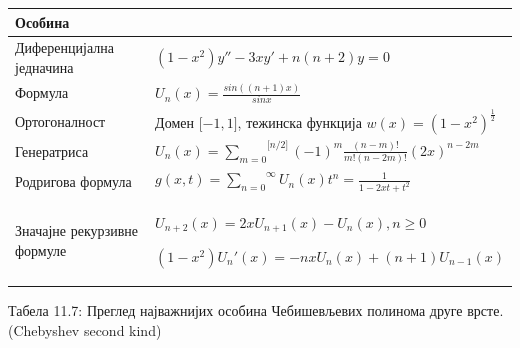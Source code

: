 {\def\LTcaptype{none} %
\begin{longtable}[]{@{}
  >{\raggedright\arraybackslash}p{}
  >{\centering\arraybackslash}p{}@{}}
\toprule\noalign{}
\begin{minipage}[b]{\linewidth}\raggedright
Особина
\end{minipage} & \begin{minipage}[b]{\linewidth}\centering
\end{minipage} \\
\midrule\noalign{}
\endhead
\bottomrule\noalign{}
\endlastfoot
Диференцијална једначина & \((1 - x^{2})y'' - 3xy' + n(n + 2)y = 0\) \\
Формула & \(U_{n}(x) = \frac{sin((n + 1)x)}{sinx}\) \\
Ортогоналност & Домен \(\lbrack - 1,1\rbrack\), тежинска функција
\(w\overset{}{(x)} = {(1 - x^{2})}^{\frac{1}{2}}\) \\
Генератриса &
\(U_{n}(x) = \overset{\lbrack n/2\rbrack}{\sum_{m = 0}}{( - 1)}^{m}\frac{(n - m)!}{m!(n - 2m)!}{(2x)}^{n - 2m}\) \\
Родригова формула &
\(g(x,t) = \overset{\infty}{\sum_{n = 0}}U_{n}(x)t^{n} = \frac{1}{1 - 2xt + t^{2}}\) \\
Значајне рекурзивне формуле &
\(U_{n + 2}(x) = 2xU_{n + 1}(x) - U_{n}(x),n \geq 0\)

\((1 - x^{2})U_{n}'(x) = - nxU_{n}(x) + (n + 1)U_{n - 1}(x)\) \\
\end{longtable}
}

Табела 11.7: Преглед најважнијих особина Чебишевљевих полинома друге
врсте. (Chebyshev second kind)

